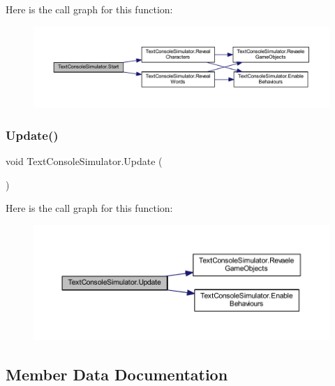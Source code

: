 Here is the call graph for this function\+:
\nopagebreak
\begin{figure}[H]
\begin{center}
\leavevmode
\includegraphics[width=350pt]{class_text_console_simulator_a9e43e79bb6b5c9b3ecfa426ded2a7995_cgraph}
\end{center}
\end{figure}
\mbox{\label{class_text_console_simulator_a3ba3d788ab24c2b0d5949e5f34992b45}} 
\subsubsection{\texorpdfstring{Update()}{Update()}}
{\footnotesize\ttfamily void Text\+Console\+Simulator.\+Update (\begin{DoxyParamCaption}{ }\end{DoxyParamCaption})\hspace{0.3cm}{\ttfamily [private]}}

Here is the call graph for this function\+:
\nopagebreak
\begin{figure}[H]
\begin{center}
\leavevmode
\includegraphics[width=350pt]{class_text_console_simulator_a3ba3d788ab24c2b0d5949e5f34992b45_cgraph}
\end{center}
\end{figure}


\subsection{Member Data Documentation}
\mbox{\label{class_text_console_simulator_a3ac15161fc7820a923b0ca7c11b0d549}} 
